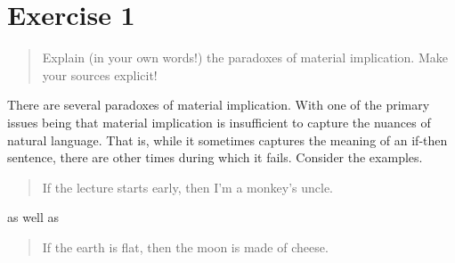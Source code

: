 \documentclass[11pt,a4paper]{article}
\begin{document}

\section*{Exercise 1}
\begin{quote}
Explain (in your own words!) the paradoxes of material implication.
Make your sources explicit!
\end{quote}
There are several paradoxes of material implication. With one of the primary issues being that material implication is insufficient to capture the nuances of natural language. That is, while it sometimes captures the meaning of an if-then sentence, there are other times during which it fails. Consider the examples.

\begin{quote}
If the lecture starts early, then I'm a monkey's uncle.
\end{quote}

as well as 

\begin{quote}
If the earth is flat, then the moon is made of cheese.
\end{quote}
\end{document}
